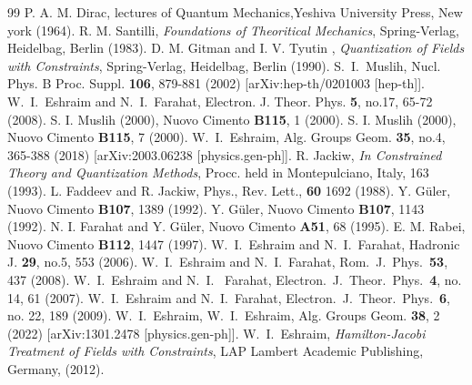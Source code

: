\documentclass[12pt]{article}
\begin{document}
\begin{thebibliography}{99}
 P. A. M. Dirac, lectures of Quantum Mechanics,Yeshiva University Press, New york (1964).
 R. M. Santilli, \emph{Foundations of Theoritical Mechanics}, Spring-Verlag, Heidelbag, Berlin (1983).
 D. M. Gitman and I. V. Tyutin , \emph{Quantization of Fields with Constraints},  Spring-Verlag, Heidelbag, Berlin (1990).
 S.~I.~Muslih,
Nucl. Phys. B Proc. Suppl. \textbf{106}, 879-881 (2002)
[arXiv:hep-th/0201003 [hep-th]].
W.~I.~Eshraim and N.~I.~Farahat,
Electron. J. Theor. Phys. \textbf{5}, no.17, 65-72 (2008).
S. I. Muslih (2000), Nuovo Cimento {\bf B115}, 1 (2000).
 S. I. Muslih (2000), Nuovo Cimento {\bf B115}, 7 (2000).
W.~I.~Eshraim,
Alg. Groups Geom. \textbf{35}, no.4, 365-388 (2018) [arXiv:2003.06238 [physics.gen-ph]].
 R. Jackiw, \emph{In Constrained Theory and Quantization Methods}, Procc. held in Montepulciano, Italy, 163 (1993).
 L. Faddeev and R. Jackiw, Phys., Rev. Lett., {\bf 60} 1692 (1988).
 Y. G\"{u}ler, Nuovo Cimento  {\bf B107}, 1389 (1992).
 Y. G\"{u}ler, Nuovo Cimento  {\bf B107}, 1143 (1992).
  N. I. Farahat and Y. G\"{u}ler, Nuovo Cimento {\bf A51}, 68 (1995).
 E. M. Rabei, Nuovo Cimento {\bf B112}, 1447 (1997).
 W.~I.~Eshraim and N.~I.~Farahat,
Hadronic J. \textbf{29}, no.5, 553 (2006).
 W.~I.~Eshraim and N.~I.~Farahat,
  Rom.\ J.\ Phys.\  {\bf 53}, 437 (2008).
W.~I.~Eshraim and N.~I.~ Farahat,
 Electron.\ J.\ Theor.\ Phys.\  {\bf 4}, no. 14,  61 (2007).
  W.~I.~Eshraim and N.~I.~Farahat,
  Electron.\ J.\ Theor.\ Phys.\  {\bf 6}, no. 22, 189 (2009).
W.~I.~Eshraim,
W.~I.~Eshraim,
Alg. Groups Geom. \textbf{38}, 2 (2022)
[arXiv:1301.2478 [physics.gen-ph]].
W.~I.~Eshraim,  \emph{Hamilton-Jacobi Treatment of Fields with Constraints}, LAP Lambert Academic Publishing, Germany, (2012).






\end{thebibliography}
\end{document}
